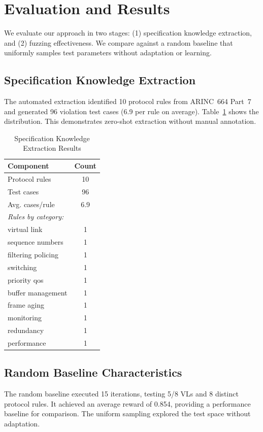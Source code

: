 \section{Evaluation and Results}
\label{sec:evaluation}

We evaluate our approach in two stages: 
(1) specification knowledge extraction, and 
(2) fuzzing effectiveness. 
We compare against a random baseline that uniformly samples 
test parameters without adaptation or learning.\n
\subsection{Specification Knowledge Extraction}\n
The automated extraction identified 10 
protocol rules from ARINC~664 Part~7 and generated 
96 violation test cases 
(6.9 per rule on average). 
Table~\ref{tab:phase1} shows the distribution. 
This demonstrates zero-shot extraction without manual annotation.\n
\begin{table}[ht]
\centering
\caption{Specification Knowledge Extraction Results}
\label{tab:phase1}
\small
\begin{tabular}{lc}
\toprule
\textbf{Component} & \textbf{Count} \\
\midrule
Protocol rules & 10 \\
Test cases & 96 \\
Avg. cases/rule & 6.9 \\
\midrule
\multicolumn{2}{l}{\textit{Rules by category:}} \\
\quad virtual link & 1 \\
\quad sequence numbers & 1 \\
\quad filtering policing & 1 \\
\quad switching & 1 \\
\quad priority qos & 1 \\
\quad buffer management & 1 \\
\quad frame aging & 1 \\
\quad monitoring & 1 \\
\quad redundancy & 1 \\
\quad performance & 1 \\
\bottomrule
\end{tabular}
\end{table}\n
\subsection{Random Baseline Characteristics}\n
The random baseline executed 15 iterations, 
testing 5/8 VLs and 
8 distinct protocol rules. 
It achieved an average reward of 0.854, 
providing a performance baseline for comparison. 
The uniform sampling explored the test space without adaptation.\n